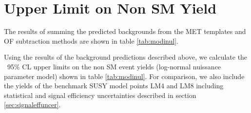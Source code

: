 \section{Upper Limit on Non SM Yield}
\label{sec:upperlimit}

The results of summing the predicted backgrounds from the MET templates and OF subtraction
methods are shown in table \ref{tab:modinul}.

\begin{comment}
\begin{table}[hbt]
  \begin{center}
	\caption{
	  \label{tab:systrestot}
	  Combination of predictions from MET templates and OF subtraction.
	}
	\begin{tabular}{lcccc}
	  \hline
	  \resulttitle
\hline

\hline
	\end{tabular}
  \end{center}
\end{table}
\end{comment}


Using the results of the background predictions described above,
we calculate the \statistics\ 95\% CL
upper limits on the non SM event yields 
(log-normal nuissance parameter model) 
shown in 
table \ref{tab:modinul}.
For comparison, we also include the yields of the benchmark SUSY model points LM4 and LM8
including statistical and signal efficiency uncertainties 
described in section \ref{sec:signaleffuncer}.

